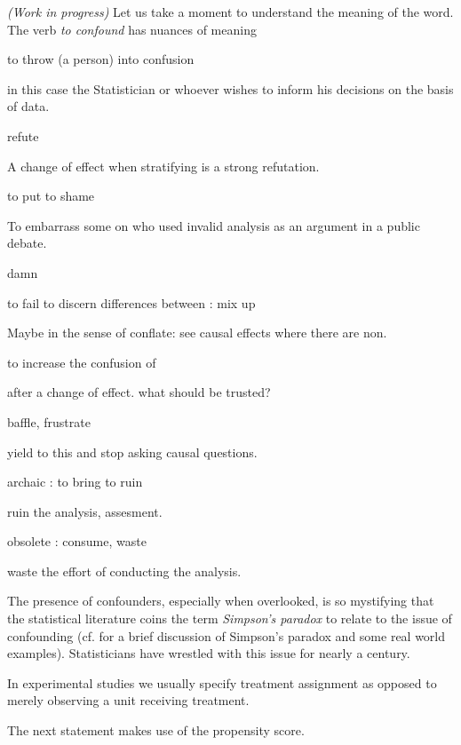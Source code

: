 \begin{ftheorem}
  \emph{(Work in progress)}
Let us take a moment to understand the meaning of the word.
The verb \textit{to confound} has nuances of meaning\cite{zotero-327}

to throw (a person) into confusion

in this case the Statistician or whoever wishes to inform his decisions on the basis of data.

refute

A change of effect when stratifying is a strong refutation.

to put to shame

To embarrass some on who used invalid analysis as an argument in a  public debate. 

damn



to fail to discern differences between : mix up

Maybe in the sense of conflate: see causal effects where there are non.

to increase the confusion of

after a change of effect. what should be trusted?

baffle, frustrate

yield to this and stop asking causal questions.



archaic : to bring to ruin

ruin the analysis, assesment.

 obsolete : consume, waste 

 waste the effort of conducting the analysis.



\end{ftheorem}

The presence of confounders, especially when overlooked, is so mystifying that the statistical literature coins the term \textit{Simpson's paradox} to relate to the issue of confounding (cf.\cite{Wagner1982} for a brief discussion of Simpson's paradox and some real world examples).
Statisticians have wrestled with this issue for nearly a century.

In experimental studies we usually specify treatment assignment as opposed to merely observing a unit receiving treatment. 

The next statement makes use of the propensity score.

